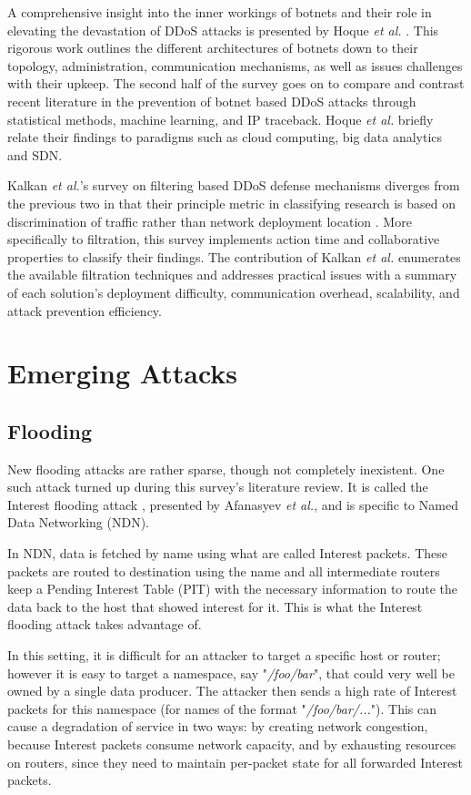 \documentclass[conference]{IEEEtran}
\begin{document}
A comprehensive insight into the inner workings of botnets and their role in elevating the devastation of DDoS attacks is presented by Hoque \textit{et al.} \cite{Botnet:Hoque}. This rigorous work outlines the different architectures of botnets down to their topology, administration, communication mechanisms, as well as issues challenges with their upkeep. The second half of the survey goes on to compare and contrast recent literature in the prevention of botnet based DDoS attacks through statistical methods, machine learning, and IP traceback. Hoque \textit{et al.} briefly relate their findings to paradigms such as cloud computing, big data analytics and SDN.

Kalkan \textit{et al.}'s survey on filtering based DDoS defense mechanisms diverges from the previous two in that their principle metric in classifying research is based on discrimination of traffic rather than network deployment location \cite{Filtration:Kalkan}. More specifically to filtration, this survey implements action time and collaborative properties to classify their findings. The contribution of Kalkan \textit{et al.} enumerates the available filtration techniques and addresses practical issues with a summary of each solution's deployment difficulty, communication overhead, scalability, and attack prevention efficiency. 

\section{Emerging Attacks}
\subsection{Flooding}
New flooding attacks are rather sparse, though not completely inexistent. One such attack turned up during this survey's literature review. It is called the Interest flooding attack \cite{Afanasyev:NDN}, presented by Afanasyev \textit{et al.}, and is specific to Named Data Networking (NDN).

In NDN, data is fetched by name using what are called Interest packets. These packets are routed to destination using the name and all intermediate routers keep a Pending Interest Table (PIT) with the necessary information to route the data back to the host that showed interest for it. This is what the Interest flooding attack takes advantage of.

In this setting, it is difficult for an attacker to target a specific host or router; however it is easy to target a namespace, say "\textit{/foo/bar}", that could very well be owned by a single data producer. The attacker then sends a high rate of Interest packets for this namespace (for names of the format "\textit{/foo/bar/...}"). This can cause a degradation of service in two ways: by creating network congestion, because Interest packets consume network capacity, and by exhausting resources on routers, since they need to maintain per-packet state for all forwarded Interest packets.
\end{document}
